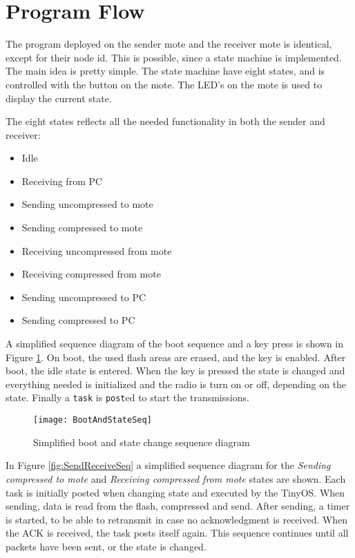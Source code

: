 \section{Program Flow}
\label{sec:program_flow}
The program deployed on the sender mote and the receiver mote is identical, except for their node id.
This is possible, since a state machine is implemented. The main idea is pretty simple. The state machine have eight states, and is controlled with the button on the mote. The LED's on the mote is used to display the current state.


The eight states reflects all the needed functionality in both the sender and receiver:
\begin{itemize}
\item Idle
\item Receiving from PC
\item Sending uncompressed to mote
\item Sending compressed to mote
\item Receiving uncompressed from mote
\item Receiving compressed from mote
\item Sending uncompressed to PC
\item Sending compressed to PC
\end{itemize}

A simplified sequence diagram of the boot sequence and a key press is shown in Figure \ref{fig:BootAndState}. On boot, the used flash areas are erased, and the key is enabled. After boot, the idle state is entered. When the key is pressed the state is changed and everything needed is initialized and the radio is turn on or off, depending on the state. Finally a \texttt{task} is \texttt{post}ed to start the transmissions.

\begin{figure}[H]
\centering
\texttt{[image: BootAndStateSeq]}
\caption{Simplified boot and state change sequence diagram}
\label{fig:BootAndState}
\end{figure}

In Figure \ref{fig:SendReceiveSeq} a simplified sequence diagram for the \emph{Sending compressed to mote} and \emph{Receiving compressed from mote} states are shown. Each task is initially posted when changing state and executed by the TinyOS. When sending, data is read from the flash, compressed and send. After sending, a timer is started, to be able to retransmit in case no acknowledgment is received. When the ACK is received, the task posts itself again. This sequence continues until all packets have been sent, or the state is changed.

